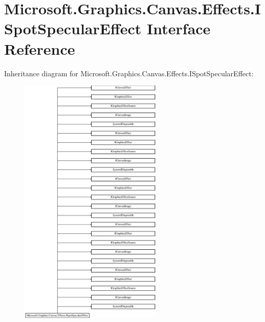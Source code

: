 \hypertarget{interface_microsoft_1_1_graphics_1_1_canvas_1_1_effects_1_1_i_spot_specular_effect}{}\section{Microsoft.\+Graphics.\+Canvas.\+Effects.\+I\+Spot\+Specular\+Effect Interface Reference}
\label{interface_microsoft_1_1_graphics_1_1_canvas_1_1_effects_1_1_i_spot_specular_effect}
Inheritance diagram for Microsoft.\+Graphics.\+Canvas.\+Effects.\+I\+Spot\+Specular\+Effect\+:\begin{figure}[H]
\begin{center}
\leavevmode
\includegraphics[height=12.000000cm]{interface_microsoft_1_1_graphics_1_1_canvas_1_1_effects_1_1_i_spot_specular_effect}
\end{center}
\end{figure}
